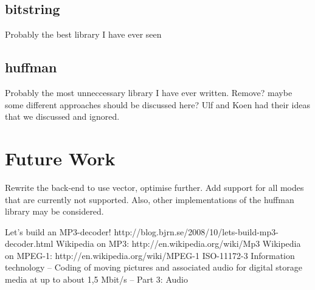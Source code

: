 \documentclass[a4paper,12pt]{article}
\begin{document}
    \subsection{bitstring}
    \label{sec:bitstring}
        Probably the best library I have ever seen
    \subsection{huffman}
    \label{sec:huffman}
        Probably the most unneccessary library I have ever written. Remove?
        maybe some different approaches should be discussed here? Ulf and Koen
        had their ideas that we discussed and ignored.

\section{Future Work}
    Rewrite the back-end to use vector, optimise further. Add support for
    all modes that are currently not supported. Also, other implementations of
    the huffman library may be considered.

\begin{thebibliography}{99}
        Let's build an MP3-decoder!
        http://blog.bjrn.se/2008/10/lets-build-mp3-decoder.html
        Wikipedia on MP3: http://en.wikipedia.org/wiki/Mp3
        Wikipedia on MPEG-1: http://en.wikipedia.org/wiki/MPEG-1
        ISO-11172-3 Information technology -- Coding of moving pictures and
        associated audio for digital storage media at up to about 1,5 Mbit/s --
        Part 3: Audio
\end{thebibliography}
\end{document}
